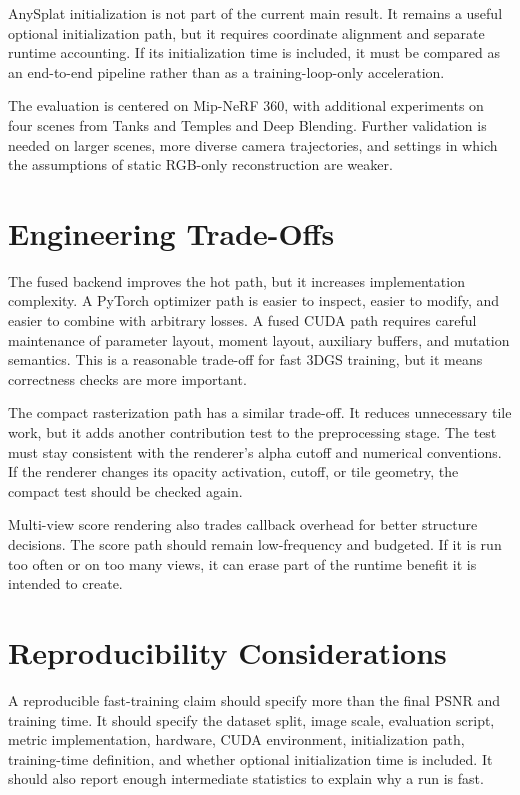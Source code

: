 AnySplat initialization is not part of the current main result. It remains a useful optional initialization path, but it requires coordinate alignment and separate runtime accounting. If its initialization time is included, it must be compared as an end-to-end pipeline rather than as a training-loop-only acceleration.

The evaluation is centered on Mip-NeRF 360, with additional experiments on four scenes from Tanks and Temples and Deep Blending. Further validation is needed on larger scenes, more diverse camera trajectories, and settings in which the assumptions of static RGB-only reconstruction are weaker.

\section{Engineering Trade-Offs}

The fused backend improves the hot path, but it increases implementation complexity. A PyTorch optimizer path is easier to inspect, easier to modify, and easier to combine with arbitrary losses. A fused CUDA path requires careful maintenance of parameter layout, moment layout, auxiliary buffers, and mutation semantics. This is a reasonable trade-off for fast 3DGS training, but it means correctness checks are more important.

The compact rasterization path has a similar trade-off. It reduces unnecessary tile work, but it adds another contribution test to the preprocessing stage. The test must stay consistent with the renderer's alpha cutoff and numerical conventions. If the renderer changes its opacity activation, cutoff, or tile geometry, the compact test should be checked again.

Multi-view score rendering also trades callback overhead for better structure decisions. The score path should remain low-frequency and budgeted. If it is run too often or on too many views, it can erase part of the runtime benefit it is intended to create.

\section{Reproducibility Considerations}

A reproducible fast-training claim should specify more than the final PSNR and training time. It should specify the dataset split, image scale, evaluation script, metric implementation, hardware, CUDA environment, initialization path, training-time definition, and whether optional initialization time is included. It should also report enough intermediate statistics to explain why a run is fast.

